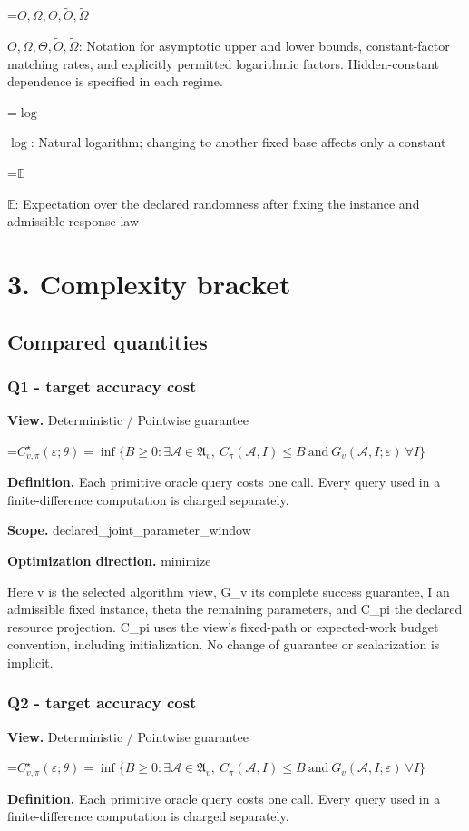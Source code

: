 \documentclass[10pt,a4paper]{article}
\newcommand{\AtlasMath}[1]{\par\begingroup\centering\setbox0=\hbox{$\displaystyle #1$}\ifdim\wd0>1.4\linewidth\typeout{ATLAS WIDE FORMULA: \the\wd0}\fi\ifdim\wd0>\linewidth\resizebox{\linewidth}{!}{\box0}\else\box0\fi\par\endgroup}
\newcommand{\AtlasInlineMath}[1]{\begingroup\setbox0=\hbox{$#1$}\ifdim\wd0>.4\linewidth\endgroup\AtlasMath{#1}\else\endgroup$#1$\fi}
\begin{document}
\AtlasInlineMath{O,\Omega,\Theta,\widetilde{O},\widetilde\Omega}: Notation for asymptotic upper and lower bounds, constant-factor matching rates, and explicitly permitted logarithmic factors. Hidden-constant dependence is specified in each regime.

\AtlasInlineMath{\log}: Natural logarithm; changing to another fixed base affects only a constant

\AtlasInlineMath{\mathbb{E}}: Expectation over the declared randomness after fixing the instance and admissible response law

\section{3. Complexity bracket}
\subsection{Compared quantities}
\subsubsection{Q1 - target accuracy cost}
\textbf{View.} Deterministic / Pointwise guarantee

\AtlasMath{C^\star_{v,\pi}(\varepsilon;\theta)=\inf\{B\ge0:\exists\mathcal A\in\mathfrak A_v,\ C_\pi(\mathcal A,I)\le B\ \text{and}\ G_v(\mathcal A,I;\varepsilon)\ \forall I\}}
\textbf{Definition.} Each primitive oracle query costs one call. Every query used in a finite-difference computation is charged separately.

\textbf{Scope.} declared\_joint\_parameter\_window

\textbf{Optimization direction.} minimize

Here v is the selected algorithm view, G\_v its complete success guarantee, I an admissible fixed instance, theta the remaining parameters, and C\_pi the declared resource projection. C\_pi uses the view's fixed-path or expected-work budget convention, including initialization. No change of guarantee or scalarization is implicit.

\subsubsection{Q2 - target accuracy cost}
\textbf{View.} Deterministic / Pointwise guarantee

\AtlasMath{C^\star_{v,\pi}(\varepsilon;\theta)=\inf\{B\ge0:\exists\mathcal A\in\mathfrak A_v,\ C_\pi(\mathcal A,I)\le B\ \text{and}\ G_v(\mathcal A,I;\varepsilon)\ \forall I\}}
\textbf{Definition.} Each primitive oracle query costs one call. Every query used in a finite-difference computation is charged separately.
\end{document}
